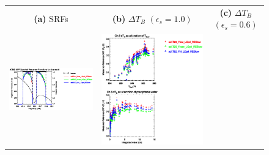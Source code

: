 \begin{figure}[H]
  \centering
  \begin{tabular}{c c c}
    \textsf{\textbf{(a)} SRFs} &
    \textsf{\textbf{(b)} $\Delta T_B$ $(\epsilon_s = 1.0)$} &
    \textsf{\textbf{(c)} $\Delta T_B$ $(\epsilon_s = 0.6)$} \\
    \includegraphics[bb=80 400 280 558,clip,scale=0.85]{graphics/srf/Vset/atms_npp.ch6.osrf.eps} &
    \includegraphics[bb=85 400 260 558,clip,scale=0.85]{graphics/dtb/Vset/e1.0_r0.0/atms_npp.ch6.dTb.eps} & 

\end{tabular}
\end{figure}
